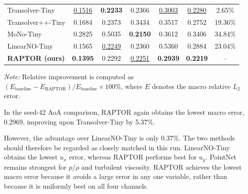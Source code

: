 \documentclass[a4paper,fleqn]{cas-sc}
\begin{document}
\begin{center}
\begin{minipage}{1.00\linewidth}
\begin{tabular}{@{}lccccc@{\hspace{8pt}}c@{}}
        Transolver-Tiny
        & \underline{0.1516}
        & \textbf{0.2233}
        & 0.2366
        & \underline{0.3003}
        & \underline{0.2280}
        & 2.65\% \\
        
        Transolver++-Tiny
        & 0.1684
        & 0.2373
        & 0.3434
        & 0.3517
        & 0.2752
        & 19.36\% \\
        
        MoNo-Tiny
        & 0.2825
        & 0.5035
        & \textbf{0.2150}
        & 0.3612
        & 0.3406
        & 34.84\% \\
        
        LinearNO-Tiny
        & 0.1565
        & \underline{0.2249}
        & 0.2360
        & 0.5360
        & 0.2884
        & 23.04\% \\
        
        \midrule
        
        \textbf{RAPTOR (ours)}
        & \textbf{0.1395}
        & 0.2292
        & \underline{0.2251}
        & \textbf{0.2939}
        & \textbf{0.2219}
        & -- \\
        
        \bottomrule
    \end{tabular}
    
    \vspace{2pt}
    \begin{minipage}{0.98\linewidth}
        \footnotesize
        \textit{Note:} Relative improvement is computed as
        \(\left(E_{\mathrm{baseline}}-E_{\mathrm{RAPTOR}}\right)/
        E_{\mathrm{baseline}}\times100\%\), where \(E\) denotes the
        macro relative \(L_2\) error. 
    \end{minipage}
    \end{minipage}
\end{center}



In the seed-42 AoA comparison, RAPTOR again obtains the lowest macro
error, 0.2969, improving upon Transolver-Tiny by 5.37\%.

However, the advantage over LinearNO-Tiny is only 0.37\%. The two methods
should therefore be regarded as closely matched in this run.
LinearNO-Tiny obtains the lowest \(u_x\) error, whereas RAPTOR
performs best for \(u_y\). PointNet remains strongest for \(p/\rho\) and
turbulent viscosity. RAPTOR achieves the lowest macro error because it
avoids a large error in any one variable, rather than because it is uniformly
best on all four channels.
\end{document}
